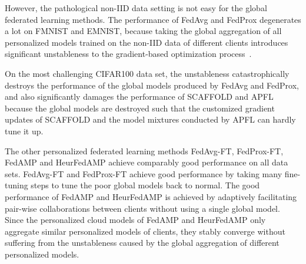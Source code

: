 However, the pathological non-IID data setting is not easy for the global federated learning methods.
The performance of FedAvg and FedProx degenerates a lot on FMNIST and EMNIST, because taking the global aggregation of all personalized models trained on the non-IID data of different clients introduces significant unstableness to the gradient-based optimization process~\cite{zhang2020fedpd}.

On the most challenging CIFAR100 data set,
the unstableness catastrophically destroys the performance of the global models produced by FedAvg and FedProx, and also significantly damages the performance of SCAFFOLD and APFL because the global models are destroyed
such that the customized gradient updates of SCAFFOLD and the model mixtures conducted by APFL can hardly tune it up. 

The other personalized federated learning methods FedAvg-FT, FedProx-FT, FedAMP and HeurFedAMP achieve comparably good performance on all data sets. 
FedAvg-FT and FedProx-FT achieve good performance by taking many fine-tuning steps to tune the poor global models back to normal.
The good performance of FedAMP and HeurFedAMP is achieved by adaptively facilitating pair-wise collaborations between clients without using a single global model. Since the personalized cloud models of 
FedAMP and HeurFedAMP only aggregate similar personalized models of clients, they stably converge without suffering from the unstableness caused by the global aggregation of different personalized models.













